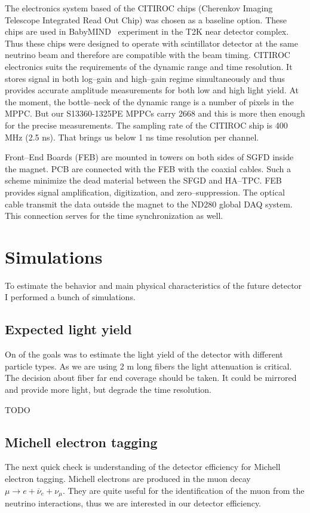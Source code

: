\documentclass[main.tex]{subfiles}
\begin{document}
The electronics system based of the CITIROC chips (Cherenkov Imaging Telescope Integrated Read Out Chip) was chosen as a baseline option. These chips are used in BabyMIND~\cite{Blondel2015b} experiment in the T2K near detector complex. Thus these chips were designed to operate with scintillator detector at the same neutrino beam and therefore are compatible with the beam timing. CITIROC electronics suits the requirements of the dynamic range and time resolution. It stores signal in both log--gain and high--gain regime simultaneously and thus provides accurate amplitude measurements for both low and high light yield. At the moment, the bottle--neck of the dynamic range is a number of pixels in the MPPC. But our S13360-1325PE MPPCs carry 2668 and this is more then enough for the precise measurements. The sampling rate of the CITIROC ship is 400 MHz (2.5 ns). That brings us below 1 ns time resolution per channel.

Front--End Boards (FEB) are mounted in towers on both sides of SGFD inside the magnet. PCB are connected with the FEB with the coaxial cables. Such a scheme minimize the dead material between the SFGD and HA--TPC. FEB provides signal amplification, digitization, and zero--suppression. The optical cable transmit the data outside the magnet to the ND280 global DAQ system. This connection serves for the time synchronization as well.

\section{Simulations}
To estimate the behavior and main physical characteristics of the future detector I performed a bunch of simulations.

\subsection{Expected light yield}
On of the goals was to estimate the light yield of the detector with different particle types. As we are using 2 m long fibers the light attenuation is critical. The decision about fiber far end coverage should be taken. It could be mirrored and provide more light, but degrade the time resolution.

TODO

\subsection{Michell electron tagging}
The next quick check is understanding of the detector efficiency for Michell electron tagging. Michell electrons are produced in the muon decay $\mu\to e+\overline{\nu}_e+\nu_\mu$. They are quite useful for the identification of the muon from the neutrino interactions, thus we are interested in our detector efficiency.
\end{document}
